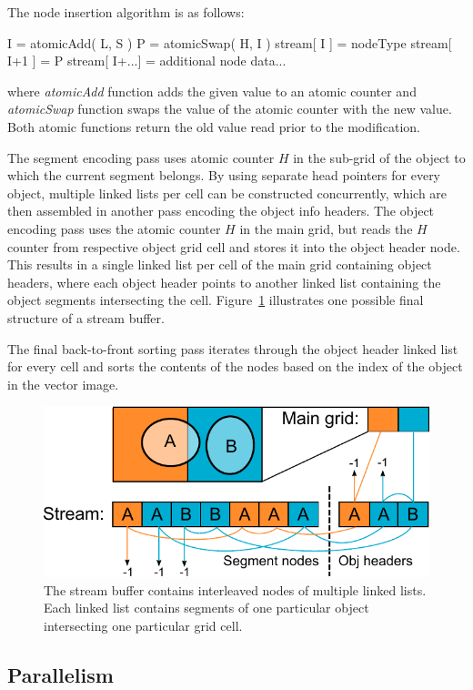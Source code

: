 \documentclass[11pt,a4paper,twoside]{article}
\begin{document}
The node insertion algorithm is as follows:
\begin{verbatimtab}[3]
	I = atomicAdd( L, S )
	P = atomicSwap( H, I )
	stream[ I ] = nodeType
	stream[ I+1 ] = P
	stream[ I+...] = additional node data...
\end{verbatimtab}

where \emph{atomicAdd} function adds the given value to an atomic counter and \emph{atomicSwap} function swaps the value of the atomic counter with the new value. Both atomic functions return the old value read prior to the modification.

The segment encoding pass uses atomic counter $H$ in the sub-grid of the object to which the current segment belongs. By using separate head pointers for every object, multiple linked lists per cell can be constructed concurrently, which are then assembled in another pass encoding the object info headers. The object encoding pass uses the atomic counter $H$ in the main grid, but reads the $H$ counter from respective object grid cell and stores it into the object header node. This results in a single linked list per cell of the main grid containing object headers, where each object header points to another linked list containing the object segments intersecting the cell. Figure~\ref{fig:obj_stream} illustrates one possible final structure of a stream buffer.

The final back-to-front sorting pass iterates through the object header linked list for every cell and sorts the contents of the nodes based on the index of the object in the vector image.

\begin {figure} 
	\centering
	\includegraphics[width=0.6\columnwidth] {figures/obj_stream}
	\caption {The stream buffer contains interleaved nodes of multiple linked lists. Each linked list contains segments of one particular object intersecting one particular grid cell.}
	\label {fig:obj_stream}
\end {figure}

\subsection {Parallelism}
\end{document}
